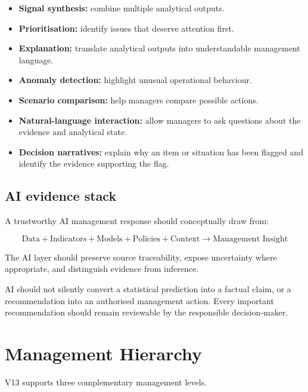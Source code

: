 \documentclass[11pt,a4paper]{article}
\begin{document}
\begin{itemize}
\item \textbf{Signal synthesis:} combine multiple analytical outputs.
\item \textbf{Prioritisation:} identify issues that deserve attention first.
\item \textbf{Explanation:} translate analytical outputs into understandable
      management language.
\item \textbf{Anomaly detection:} highlight unusual operational behaviour.
\item \textbf{Scenario comparison:} help managers compare possible actions.
\item \textbf{Natural-language interaction:} allow managers to ask questions
      about the evidence and analytical state.
\item \textbf{Decision narratives:} explain why an item or situation has been
      flagged and identify the evidence supporting the flag.
\end{itemize}

\subsection{AI evidence stack}

A trustworthy AI management response should conceptually draw from:

\[
\boxed{
\text{Data}
+
\text{Indicators}
+
\text{Models}
+
\text{Policies}
+
\text{Context}
\rightarrow
\text{Management Insight}
}
\]

The AI layer should preserve source traceability, expose uncertainty where
appropriate, and distinguish evidence from inference.

\begin{warningbox}
AI should not silently convert a statistical prediction into a factual claim,
or a recommendation into an authorised management action. Every important
recommendation should remain reviewable by the responsible decision-maker.
\end{warningbox}

\section{Management Hierarchy}

V13 supports three complementary management levels.
\end{document}
